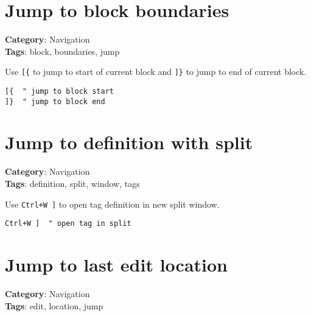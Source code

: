 {{{{{{{{\begin{Exa*}{}
\begin{Verbatim}[fontsize=\footnotesize, breaklines, breakanywhere]
%   "jumps between corresponding parenthesis
\end{Verbatim}
\end{Exa*}

\section{Jump to block boundaries}

\textbf{Category}: Navigation\\ \textbf{Tags}: block, boundaries, jump
\vspace{0.5cm}

Use {\footnotesize \Verb§[{§} to jump to start of current block and {\footnotesize \Verb§]}§} to jump to end of current block.

\begin{Exa*}{}
\begin{Verbatim}[fontsize=\footnotesize, breaklines, breakanywhere]
[{  " jump to block start
]}  " jump to block end
\end{Verbatim}
\end{Exa*}

\section{Jump to definition with split}

\textbf{Category}: Navigation\\ \textbf{Tags}: definition, split, window, tags
\vspace{0.5cm}

Use {\footnotesize \Verb§Ctrl+W ]§} to open tag definition in new split window.

\begin{Exa*}{}
\begin{Verbatim}[fontsize=\footnotesize, breaklines, breakanywhere]
Ctrl+W ]  " open tag in split
\end{Verbatim}
\end{Exa*}

\section{Jump to last edit location}

\textbf{Category}: Navigation\\ \textbf{Tags}: edit, location, jump
\vspace{0.5cm}

}}}}}}}}
